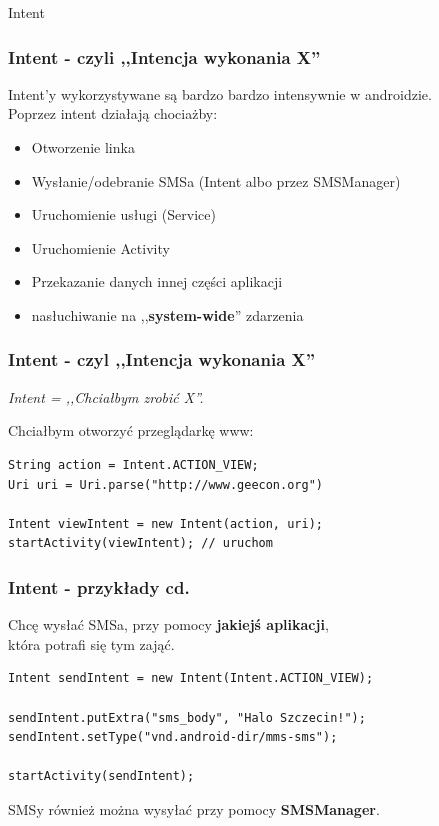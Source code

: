 \documentclass{beamer}
\begin{document}
\begin{frame}
\begin{center}
 \Huge{Intent}
\end{center}
\end{frame}

\begin{frame}\frametitle{Intent - czyli ,,Intencja wykonania X''}
Intent'y wykorzystywane są bardzo bardzo intensywnie w androidzie.\\
Poprzez intent działają chociażby:
\begin{itemize}
 \item Otworzenie linka
 \pause \item Wysłanie/odebranie SMSa \pause (Intent albo przez SMSManager)
 \pause \item Uruchomienie usługi (Service)
 \pause \item Uruchomienie Activity
 \pause \item Przekazanie danych innej części aplikacji
 \pause \item nasłuchiwanie na ,,\textbf{system-wide}'' zdarzenia
\end{itemize}
\end{frame}

\begin{frame}[fragile]\frametitle{Intent - czyl ,,Intencja wykonania X''}
\begin{center}
 \textit{Intent = ,,Chciałbym zrobić X''.}

\pause
Chciałbym otworzyć przeglądarkę www:
\end{center}

\begin{lstlisting}
String action = Intent.ACTION_VIEW; 
Uri uri = Uri.parse("http://www.geecon.org")

Intent viewIntent = new Intent(action, uri);
startActivity(viewIntent); // uruchom
\end{lstlisting}
\end{frame}

\begin{frame}[fragile]\frametitle{Intent - przykłady cd.}
\begin{center}
Chcę wysłać SMSa, przy pomocy \textbf{jakiejś aplikacji}, \\
która potrafi się tym zająć.
\end{center}

\begin{lstlisting}
Intent sendIntent = new Intent(Intent.ACTION_VIEW);

sendIntent.putExtra("sms_body", "Halo Szczecin!"); 
sendIntent.setType("vnd.android-dir/mms-sms");

startActivity(sendIntent);
\end{lstlisting}

\pause
SMSy również można wysyłać przy pomocy \textbf{SMSManager}.
\end{frame}
\end{document}
